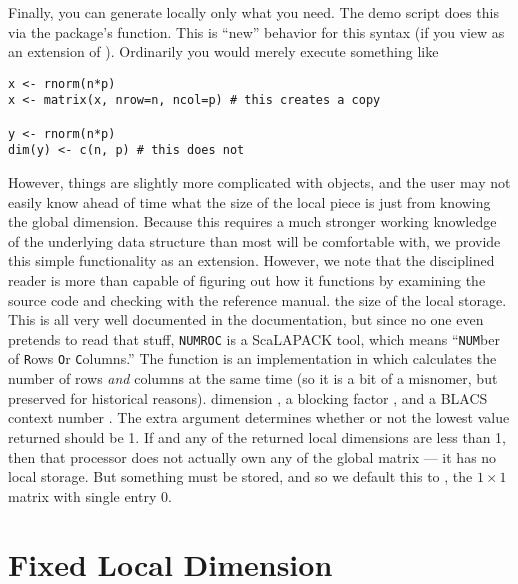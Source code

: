 Finally, you can generate locally only what you need.  The demo script does this 
via the  package's  function.  This is ``new'' 
behavior for this syntax (if you view  as an extension of 
).  Ordinarily you would merely execute something like
\begin{lstlisting}[language=rr,title=Creating a random normal matrix in serial 
R]
x <- rnorm(n*p)
x <- matrix(x, nrow=n, ncol=p) # this creates a copy

y <- rnorm(n*p)
dim(y) <- c(n, p) # this does not
\end{lstlisting}
However, things are slightly more complicated with  objects, and 
the user may not easily know ahead of time what the size of the local piece is 
just from knowing the global dimension.  Because this requires a much stronger 
working knowledge of the underlying data structure than most will be comfortable 
with, we provide this simple functionality as an extension.  However, we note 
that the disciplined reader is more than capable of figuring out how it 
functions by examining the source code and checking with the reference manual.
% 
the size of the local storage.  This is all very well documented in the 
 documentation, but since no one even pretends to read that stuff, 
\texttt{NUMROC} is a ScaLAPACK tool, which means ``\texttt{NUM}ber of 
\texttt{R}ows \texttt{O}r \texttt{C}olumns.''  The function  
is an implementation in  which calculates the number of rows 
\emph{and} columns at the same time (so it is a bit of a misnomer, but preserved 
for historical reasons).  
% 
dimension , a blocking factor , and a BLACS context number 
.  The extra argument  determines whether or not the 
lowest value returned should be 1.  If  and any of the 
returned local dimensions are less than 1, then that processor does not actually 
own any of the global matrix --- it has no local storage.  But something must be 
stored, and so we default this to , the $1\times 1$ matrix with 
single entry 0.





\section{Fixed Local Dimension}

